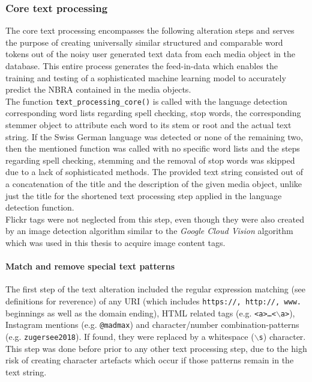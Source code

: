 \subsubsection{Core text processing} \label{core_text_processing}
The core text processing encompasses the following alteration steps and serves the purpose of creating universally similar structured and comparable word tokens out of the noisy user generated text data from each media object in the database. This entire process generates the feed-in-data which enables the training and testing of a sophisticated machine learning model to accurately predict the NBRA contained in the media objects.\\
\newline
The function \texttt{text\_processing\_core()} is called with the language detection corresponding word lists regarding spell checking, stop words, the corresponding stemmer object to attribute each word to its stem or root and the actual text string. If the Swiss German language was detected or none of the remaining two, then the mentioned function was called with no specific word lists and the steps regarding spell checking, stemming and the removal of stop words was skipped due to a lack of sophisticated methods. The provided text string consisted out of a concatenation of the title and the description of the given media object, unlike just the title for the shortened text processing step applied in the language detection function.\\
Flickr tags were not neglected from this step, even though they were also created by an image detection algorithm similar to the \textit{Google Cloud Vision} algorithm which was used in this thesis to acquire image content tags.

\paragraph*{Match and remove special text patterns} \label{text_patterns}
The first step of the text alteration included the regular expression matching (see definitions for reverence) of any URI (which includes \texttt{https://, http://, www.} beginnings as well as the domain ending), HTML related tags (e.g. \texttt{<a>\dots<$\backslash$a>}), Instagram mentions (e.g. \texttt{@madmax}) and character/number combination-patterns (e.g. \texttt{zugersee2018}). If found, they were replaced by a whitespace (\texttt{$\backslash$s}) character. This step was done before prior to any other text processing step, due to the high risk of creating character artefacts which occur if those patterns remain in the text string.

